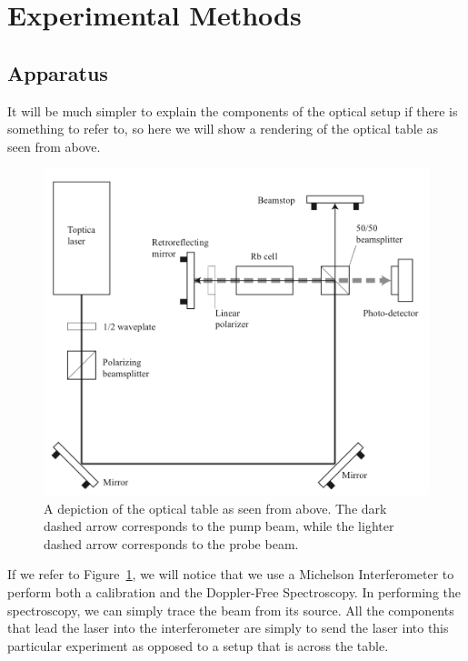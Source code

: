 \documentclass{article}
\begin{document}
\section{Experimental Methods}
  \subsection{Apparatus}
  It will be much simpler to explain the components of the optical setup if there is something to refer to, so here we will show a rendering of the optical table as seen from above.

  \begin{figure}[!htb]
    \centering
    \includegraphics[scale=.25]{hyperfine_apparatus.png}
    \caption{A depiction of the optical table as seen from above.  The dark dashed arrow corresponds to the pump beam, while the lighter dashed arrow corresponds to the probe beam.}
    \label{apparatus}
  \end{figure}

  If we refer to Figure~\ref{apparatus}, we will notice that we use a Michelson Interferometer to perform both a calibration and the Doppler-Free Spectroscopy.  In performing the spectroscopy, we can simply trace the beam from its source.  All the components that lead the laser into the interferometer are simply to send the laser into this particular experiment as opposed to a setup that is across the table.

  \hspace{.25cm}
\end{document}
